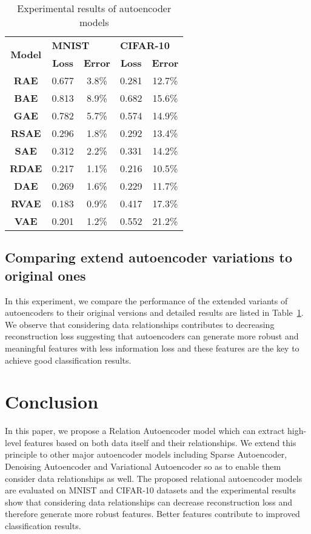 \documentclass[conference]{IEEEtran}
\begin{document}
	\begin{table}[t]
		\renewcommand{\arraystretch}{1.5}
		\centering
		\caption{Experimental results of autoencoder models}
		\label{my-label}
		\begin{tabular}{|c|c|c|c|c|}
			\hline
			\multirow{2}{*}{\textbf{Model}}
			& \multicolumn{2}{l|}{\textbf{\hspace*{0.6cm}MNIST}}
			& \multicolumn{2}{l|}{\textbf{\hspace*{0.3cm}CIFAR-10}} \\ \cline{2-5}
			& \textbf{Loss} & \textbf{Error}
			& \textbf{Loss} & \textbf{Error}       \\ \hline \hline
			\textbf{RAE}  & 0.677 & 3.8\% & 0.281 & 12.7\% \\ \hline
			\textbf{BAE}  & 0.813 & 8.9\% & 0.682 & 15.6\% \\ \hline
			\textbf{GAE}  & 0.782 & 5.7\% & 0.574 & 14.9\% \\ \hline \hline
			\textbf{RSAE} & 0.296 & 1.8\% & 0.292 & 13.4\% \\ \hline
			\textbf{SAE}  & 0.312 & 2.2\% & 0.331 & 14.2\% \\ \hline \hline
			\textbf{RDAE} & 0.217 & 1.1\% & 0.216 & 10.5\% \\ \hline
			\textbf{DAE}  & 0.269 & 1.6\% & 0.229 & 11.7\% \\ \hline \hline
			\textbf{RVAE} & 0.183 & 0.9\% & 0.417 & 17.3\% \\ \hline
			\textbf{VAE}  & 0.201 & 1.2\% & 0.552 & 21.2\% \\ \hline \hline
		\end{tabular}
	\end{table}
	
	\subsection{Comparing extend autoencoder variations to original ones}
	In this experiment, we compare the performance of the extended variants of autoencoders to their original versions and detailed results are listed in Table~\ref{my-label}. We observe that considering data relationships contributes to decreasing reconstruction loss suggesting that autoencoders can generate more robust and meaningful features with less information loss and these features are the key to achieve good classification results.
		
	\section{Conclusion} \label{sec7}
	In this paper, we propose a Relation Autoencoder model which can extract high-level features based on both data itself and their relationships. We extend this principle to other major autoencoder models including Sparse Autoencoder, Denoising Autoencoder and Variational Autoencoder so as to enable them consider data relationships as well. The proposed relational autoencoder models are evaluated on MNIST and CIFAR-10 datasets and the experimental results show that considering data relationships can decrease reconstruction loss and therefore generate more robust features. Better features contribute to improved classification results.
	



	
	
	
\end{document}
